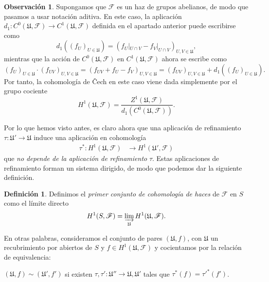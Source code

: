 \documentclass[autocontact]{gaceta}
\theoremstyle{definition} \newtheorem{defn}[thm]{Definición}
\theoremstyle{definition} \newtheorem{ejemplo}[thm]{Ejemplo}
\theoremstyle{definition} \newtheorem{ejercicio}[thm]{Ejercicio}
\newtheorem{obs}[thm]{Observación}
\def\FF{\mathscr{F}}
\def\UU{\mathfrak{U}}
\begin{document}
	  \begin{obs}
	    Supongamos que $\FF$ es un haz de grupos abelianos, de modo que pasamos a usar notación aditiva. En este caso, la aplicación $d_1:C^0(\UU,\FF) \rightarrow C^1(\UU,\FF)$ definida en el apartado anterior puede escribirse como 
	    \begin{equation*}
	      d_1 ( (f_U)_{U\in \UU} ) = ( f_U|_{U\cap V} - f_V|_{U\cap V} )_{U,V \in \UU},
	    \end{equation*}
	    mientras que la acción de $C^0(\UU,\FF)$ en $C^1(\UU,\FF)$ ahora se escribe como
	    \begin{equation*}
	      (f_U)_{U\in \UU} \cdot (f_{UV})_{U,V \in \UU} = (f_{UV} + f_U - f_V)_{U,V \in \UU} = (f_{UV})_{U,V \in \UU} + d_1((f_U)_{U\in \UU}).
	    \end{equation*}
	    Por tanto, la cohomología de \v{C}ech en este caso viene dada simplemente por el grupo cociente
	    \begin{equation*}
	      H^1(\UU,\FF) = \frac{Z^1(\UU,\FF)}{d_1(C^0(\UU,\FF))}.
	    \end{equation*}
	  \end{obs}
	
	  Por lo que hemos visto antes, es claro ahora que una aplicación de refinamiento $\tau:\UU'\rightarrow \UU$ induce una aplicación en cohomología
	  \begin{align*}
	    \tau^* :H^1(\UU,\FF)&\longrightarrow H^1(\UU',\FF)
	    \end{align*}
	    que \emph{no depende de la aplicación de refinamiento} $\tau$. Estas aplicaciones de refinamiento forman un sistema dirigido, de modo que podemos dar la siguiente definición.

	    \begin{defn}
	      Definimos el \emph{primer conjunto de cohomología de haces} de $\FF$ en $S$ como el límite directo 
	      \begin{equation*}
		H^1(S,\FF) = \varinjlim_{\UU} H^1(\UU,\FF).
	      \end{equation*}
	    \end{defn}

	    En otras palabras, consideramos el conjunto de pares $(\UU,f)$, con $\UU$ un recubrimiento por abiertos de $S$ y $f\in H^1(\UU,\FF)$ y cocientamos por la relación de equivalencia:
	    \begin{center}
	      $(\UU,f) \sim (\UU',f')$ si existen $\tau,\tau':\UU'' \rightarrow \UU, \UU'$ tales que $\tau^*(f) = \tau'^*(f')$.
	    \end{center}
\end{document}
